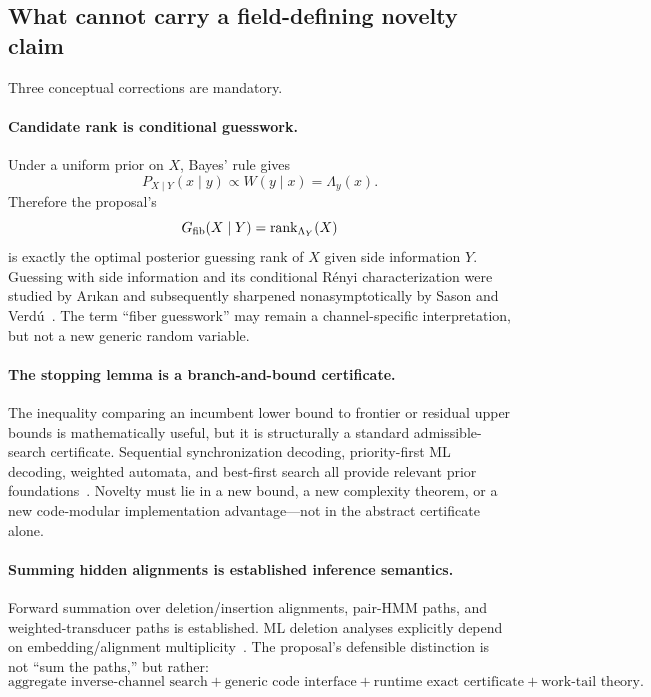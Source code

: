 \documentclass[11pt]{article}
\begin{document}
\subsection{What cannot carry a field-defining novelty claim}
Three conceptual corrections are mandatory.

\paragraph{Candidate rank is conditional guesswork.}
Under a uniform prior on $X$, Bayes' rule gives
\begin{equation}
P_{X\mid Y}(x\mid y)\propto W(y\mid x)=\Lambda_y(x).
\end{equation}
Therefore the proposal's
\begin{equation}
G_{\rm fib}(X\mid Y)=\operatorname{rank}_{\Lambda_Y}(X)
\end{equation}
is exactly the optimal posterior guessing rank of $X$ given side information $Y$. Guessing with side information and its conditional R\'enyi characterization were studied by Ar\i kan and subsequently sharpened nonasymptotically by Sason and Verd\'u~\cite{arikan1996,sasonverdu2018}. The term ``fiber guesswork'' may remain a channel-specific interpretation, but not a new generic random variable.

\paragraph{The stopping lemma is a branch-and-bound certificate.}
The inequality comparing an incumbent lower bound to frontier or residual upper bounds is mathematically useful, but it is structurally a standard admissible-search certificate. Sequential synchronization decoding, priority-first ML decoding, weighted automata, and best-first search all provide relevant prior foundations~\cite{gallager1961,han1993,mohri2009}. Novelty must lie in a new bound, a new complexity theorem, or a new code-modular implementation advantage---not in the abstract certificate alone.

\paragraph{Summing hidden alignments is established inference semantics.}
Forward summation over deletion/insertion alignments, pair-HMM paths, and weighted-transducer paths is established. ML deletion analyses explicitly depend on embedding/alignment multiplicity~\cite{davey2001,sabary2020,sabary2022}. The proposal's defensible distinction is not ``sum the paths,'' but rather:
\begin{equation}
\boxed{\text{aggregate inverse-channel search} + \text{generic code interface} + \text{runtime exact certificate} + \text{work-tail theory}.}
\end{equation}
\end{document}
